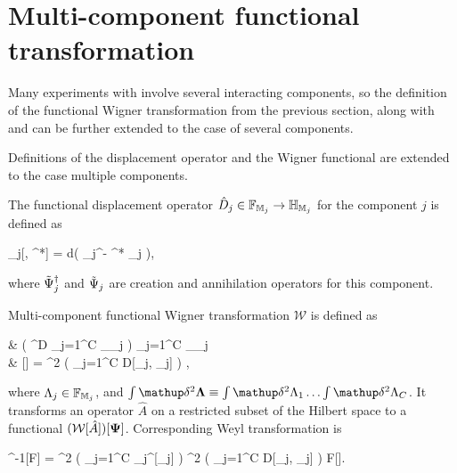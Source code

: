 \section{Multi-component functional transformation}

Many experiments with  involve several interacting components, so the definition of the functional Wigner transformation from the previous section, along with  and  can be further extended to the case of several components.

Definitions of the displacement operator and the Wigner functional are extended to the case multiple components.

\begin{definition}
	The functional displacement operator $\hat{D}_j \in \mathbb{F}_{\mathbb{M}_j} \rightarrow \mathbb{H}_{\mathbb{M}_j}$ for the component $j$ is defined as
	\begin{eqn*}
		_j[\Lambda, \Lambda^*] = \exp \int d\xvec \left(
			\Lambda \Psiop_j^\dagger - \Lambda^* \Psiop_j
		\right),
	\end{eqn*}
	where $\tilde{\Psi}_j^\dagger$ and $\tilde{\Psi}_j$ are creation and annihilation operators for this component.
\end{definition}

\begin{definition}
\label{def:wigner:mc:w-transformation}
	Multi-component functional Wigner transformation $\mathcal{W}$ is defined as
	\begin{eqn*}
		&  \in \left( ^D \rightarrow \prod_{j=1}^C _{\restbasis_j} \right)
			\rightarrow \prod_{j=1}^C _{\restbasis_j}
			\rightarrow \mathbb{C} \\
		& [\hat{A}]
		=  \int \fdelta^2 \bLambda
			\left( \prod_{j=1}^C D[\Lambda_j, \Psi_j] \right)
			\Trace{ \hat{A} \prod_{j=1}^C \hat{D}_j[\Lambda_j] },
	\end{eqn*}
	where $\Lambda_j \in \mathbb{F}_{\mathbb{M}_j}$, and $\int \fdelta^2 \bLambda \equiv \int \fdelta^2 \Lambda_1 \ldots \int \fdelta^2 \Lambda_C$.
	It transforms an operator $\hat{A}$ on a restricted subset of the Hilbert space to a functional $(\mathcal{W}[\hat{A}])[\mathbf{\Psi}]$.
	Corresponding Weyl transformation is
	\begin{eqn*}
		^{-1}[F]
		=  \int \fdelta^2 \bXi
			\left( \prod_{j=1}^C _j^{\dagger}[\Xi_j] \right)
			\int \fdelta^2 \bPhi
				\left( \prod_{j=1}^C D[\Phi_j, \Xi_j] \right)
				F[\bPhi].
	\end{eqn*}
\end{definition}

